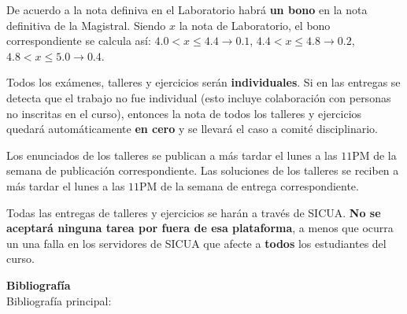 \documentclass[letterpaper,10pt,onecolumn]{article}
\begin{document}
De acuerdo a la nota definiva en el Laboratorio habr\'a {\bf un bono} en la
nota definitiva de la Magistral. 
Siendo $x$ la nota de Laboratorio, el bono correspondiente
se calcula as\'i:
$4.0 < x \leq 4.4 \rightarrow 0.1$, $4.4< x\leq 4.8\rightarrow 0.2$, $4.8<x
\leq 5.0\rightarrow 0.4$.

Todos los ex\'amenes, talleres y ejercicios ser\'an
\textbf{individuales}.  
Si en las entregas se detecta que el trabajo no fue
individual (esto incluye colaboraci\'on con personas no inscritas en
el curso), entonces la nota de todos los talleres y ejercicios quedar\'a
autom\'aticamente {\bf en cero} y se llevar\'a el caso a comit\'e
disciplinario. 

Los enunciados de los talleres se publican a m\'as tardar el lunes a
las $11$PM de la semana de publicaci\'on correspondiente. 
Las soluciones de los talleres se reciben a m\'as tardar el lunes a
las $11$PM de la semana de entrega correspondiente.

Todas las entregas de talleres y ejercicios se har\'an a trav\'es de
SICUA.  {\bf No se aceptar\'a ninguna tarea por fuera de esa
  plataforma}, a menos que ocurra un una falla en los servidores de
SICUA que afecte a {\bf todos} los estudiantes del curso.


\vspace*{0.5cm} 

\noindent\textbf{\large {} \quad
  Bibliograf\'ia}\\[-0.2cm] 



\noindent\normalsize Bibliograf\'ia principal:
\end{document}
